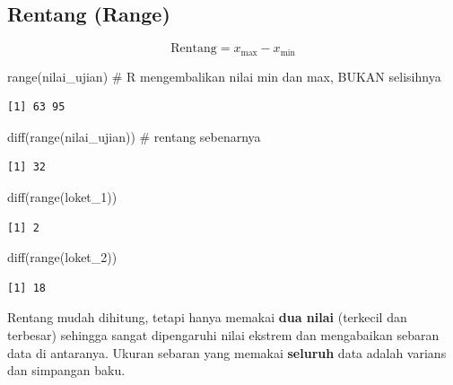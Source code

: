 \documentclass[
  indonesian,
  letterpaper,
]{book}
\newenvironment{Shaded}{\begin{snugshade}}{\end{snugshade}}
\newcommand{\CommentTok}[1]{\textcolor[rgb]{0.37,0.37,0.37}{#1}}
\newcommand{\FunctionTok}[1]{\textcolor[rgb]{0.28,0.35,0.67}{#1}}
\newcommand{\NormalTok}[1]{\textcolor[rgb]{0.00,0.23,0.31}{#1}}
\begin{document}
\subsection{Rentang (Range)}\label{rentang-range}

\[\text{Rentang} = x_{\text{max}} - x_{\text{min}}\]

\begin{Shaded}
\begin{Highlighting}[]
\FunctionTok{range}\NormalTok{(nilai\_ujian)              }\CommentTok{\# R mengembalikan nilai min dan max, BUKAN selisihnya}
\end{Highlighting}
\end{Shaded}

\begin{verbatim}
[1] 63 95
\end{verbatim}

\begin{Shaded}
\begin{Highlighting}[]
\FunctionTok{diff}\NormalTok{(}\FunctionTok{range}\NormalTok{(nilai\_ujian))        }\CommentTok{\# rentang sebenarnya}
\end{Highlighting}
\end{Shaded}

\begin{verbatim}
[1] 32
\end{verbatim}

\begin{Shaded}
\begin{Highlighting}[]
\FunctionTok{diff}\NormalTok{(}\FunctionTok{range}\NormalTok{(loket\_1))}
\end{Highlighting}
\end{Shaded}

\begin{verbatim}
[1] 2
\end{verbatim}

\begin{Shaded}
\begin{Highlighting}[]
\FunctionTok{diff}\NormalTok{(}\FunctionTok{range}\NormalTok{(loket\_2))}
\end{Highlighting}
\end{Shaded}

\begin{verbatim}
[1] 18
\end{verbatim}

Rentang mudah dihitung, tetapi hanya memakai \textbf{dua nilai}
(terkecil dan terbesar) sehingga sangat dipengaruhi nilai ekstrem dan
mengabaikan sebaran data di antaranya. Ukuran sebaran yang memakai
\textbf{seluruh} data adalah varians dan simpangan baku.
\end{document}
